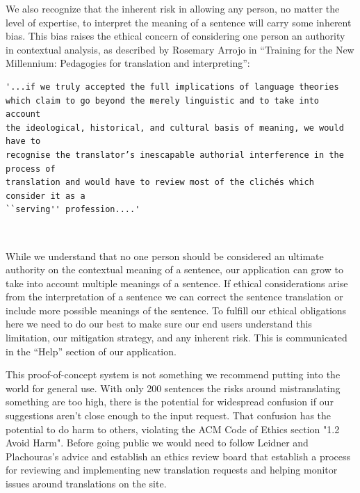 \documentclass[runningheads]{llncs}
\begin{document}
We also recognize that the inherent risk in allowing any person, no matter the level of expertise, to interpret the meaning of a sentence will carry some inherent bias. This bias raises the ethical concern of considering one person an authority in contextual analysis, as described by Rosemary Arrojo in ``Training for the New Millennium: Pedagogies for translation and interpreting'':

\begin{verbatim}
'...if we truly accepted the full implications of language theories
which claim to go beyond the merely linguistic and to take into account
the ideological, historical, and cultural basis of meaning, we would have to
recognise the translator’s inescapable authorial interference in the process of
translation and would have to review most of the clichés which consider it as a
``serving'' profession....'
\end{verbatim} ~\cite{ref_book2}

While we understand that no one person should be considered an ultimate authority on the contextual meaning of a sentence, our application can grow to take into account multiple meanings of a sentence. If ethical considerations arise from the interpretation of a sentence we can correct the sentence translation or include more possible meanings of the sentence. To fulfill our ethical obligations here we need to do our best to make sure our end users understand this limitation, our mitigation strategy, and any inherent risk. This is communicated in the ``Help'' section of our application.

This proof-of-concept system is not something we recommend putting into the world for general use. With only 200 sentences the risks around mistranslating something are too high, there is the potential for widespread confusion if our suggestions aren't close enough to the input request. That confusion has the potential to do harm to others, violating the ACM Code of Ethics section "1.2 Avoid Harm". Before going public we would need to follow Leidner and Plachouras's advice and establish an ethics review board that establish a process for reviewing and implementing new translation requests and helping monitor issues around translations on the site. 
	
\end{document}
